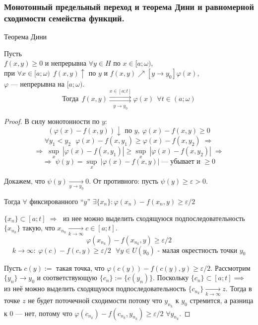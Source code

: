 \subsubsection{Монотонный предельный переход и теорема Дини и равномерной сходимости семейства функций.}

\begin{theorem*} Теорема Дини

    Пусть \\
    \phantom{Пусть} $f(x, y) \ge 0$ и непрерывна $\forall y \in H$ по $x \in [a; \omega)$, \\
    \phantom{Пусть} при $\forall x \in [a; \omega) \ \ f(x, y) \uparrow$ по $y$ и $f(x, y) \nearrow[y \to y_0]{} \varphi(x)$, \\
    \phantom{Пусть} $\varphi$ --- непрерывна на $[a; \omega)$.
    \[ \text{Тогда} \ \ f(x, y) \overset{x \in [a; t]}{\underset{y \to y_0}{\rightrightarrows}} \varphi(x) \ \ \forall t \in (a; \omega) \]
\end{theorem*}
\begin{proof}
    В силу монотонности по $y$:
    \[ (\varphi(x) - f(x, y)) \downarrow \text{ по } y, \ \varphi(x) - f(x, y) \ge 0 \]
    \[ \forall y_1 < y_2 \ \ \ \varphi(x) - f(x, y_1) \ge \varphi(x) - f(x, y_2) \;\Rightarrow \]
    \[ \Rightarrow\; \underset{x}{\sup}\:\left| \varphi(x) - f(x, y_1) \right| \ge 
    \underset{x}{\sup}\:\left| \varphi(x) - f(x, y_2) \right| \;\Rightarrow \]
    \[ \Rightarrow\; \psi(y) = \underset{x}{\sup}\:\left| \varphi(x) - f(x, y) \right| \ \text{--- убывает и } \ge 0 \]
    
    Докажем, что $\psi(y) \xrightarrow[y \to y_0]{} 0$. От противного: пусть $\psi(y) \ge \varepsilon > 0$.

    Тогда $\forall$ фиксированного ``$y$'' $\exists \{ x_n \} \colon \varphi(x_n) - f(x_n, y) \ge \varepsilon / 2$
    
    $\{ x_n \} \subset [a; t] \;\Rightarrow\;$ из нее можно выделить сходящуюся подпоследовательность $\{ x_{n_k} \}$ такую, что $x_{n_k} \xrightarrow[k \to \infty]{} c \in [a; t]$.
    \[ \varphi(x_{n_k}) - f(x_{n_k}, y) \ge \varepsilon / 2 \]
    \[ k \to \infty: \ \varphi(c) - f(c, y) \ge \varepsilon / 2 \ \ \ \forall y \in U(y_0) \textrm{ - малая окрестность точки } y_0 \]

    Пусть $c(y) := $ такая точка, что $\varphi(c(y)) - f(c(y), y) \geq \varepsilon / 2$. Рассмотрим $\{y_n\} \to y_0$ и соответствующую
    $\{c_n\} := \{c(y_n)\}$. Поскольку $\{c_n\} \subset [a; t] \implies$ из неё можно выделить сходящуюся
    подпоследовательность $\{c_{n_k}\} \xrightarrow[k\to\infty]{} z$. Тогда в точке $z$ не будет поточечной сходимости
    потому что $y_{n_k}$ к $y_0$ стремится, а разница к 0 --- нет, потому что $\varphi(c_{n_k}) - f(c_{n_k}, y_{n_k}) \geq \varepsilon/2$
    $\forall y_{n_k}$.
\end{proof}
